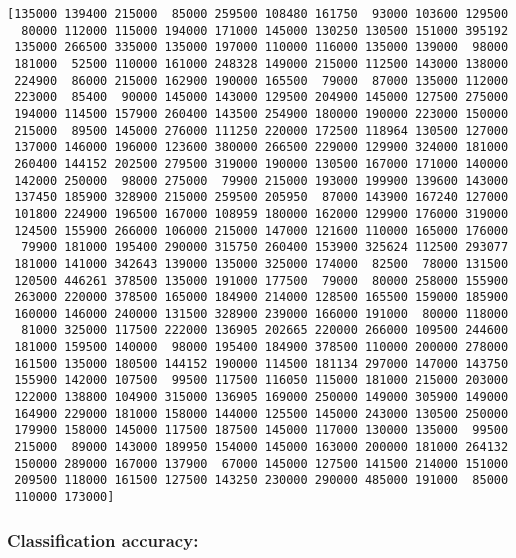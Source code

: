 \documentclass[11pt]{article}
\begin{document}
    \begin{Verbatim}[commandchars=\\\{\}]
[135000 139400 215000  85000 259500 108480 161750  93000 103600 129500
  80000 112000 115000 194000 171000 145000 130250 130500 151000 395192
 135000 266500 335000 135000 197000 110000 116000 135000 139000  98000
 181000  52500 110000 161000 248328 149000 215000 112500 143000 138000
 224900  86000 215000 162900 190000 165500  79000  87000 135000 112000
 223000  85400  90000 145000 143000 129500 204900 145000 127500 275000
 194000 114500 157900 260400 143500 254900 180000 190000 223000 150000
 215000  89500 145000 276000 111250 220000 172500 118964 130500 127000
 137000 146000 196000 123600 380000 266500 229000 129900 324000 181000
 260400 144152 202500 279500 319000 190000 130500 167000 171000 140000
 142000 250000  98000 275000  79900 215000 193000 199900 139600 143000
 137450 185900 328900 215000 259500 205950  87000 143900 167240 127000
 101800 224900 196500 167000 108959 180000 162000 129900 176000 319000
 124500 155900 266000 106000 215000 147000 121600 110000 165000 176000
  79900 181000 195400 290000 315750 260400 153900 325624 112500 293077
 181000 141000 342643 139000 135000 325000 174000  82500  78000 131500
 120500 446261 378500 135000 191000 177500  79000  80000 258000 155900
 263000 220000 378500 165000 184900 214000 128500 165500 159000 185900
 160000 146000 240000 131500 328900 239000 166000 191000  80000 118000
  81000 325000 117500 222000 136905 202665 220000 266000 109500 244600
 181000 159500 140000  98000 195400 184900 378500 110000 200000 278000
 161500 135000 180500 144152 190000 114500 181134 297000 147000 143750
 155900 142000 107500  99500 117500 116050 115000 181000 215000 203000
 122000 138800 104900 315000 136905 169000 250000 149000 305900 149000
 164900 229000 181000 158000 144000 125500 145000 243000 130500 250000
 179900 158000 145000 117500 187500 145000 117000 130000 135000  99500
 215000  89000 143000 189950 154000 145000 163000 200000 181000 264132
 150000 289000 167000 137900  67000 145000 127500 141500 214000 151000
 209500 118000 161500 127500 143250 230000 290000 485000 191000  85000
 110000 173000]

    \end{Verbatim}

    \subsubsection{Classification accuracy:}\label{classification-accuracy}
\end{document}
